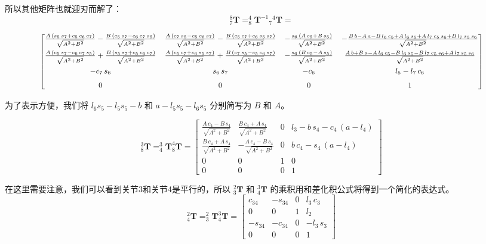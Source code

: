 \documentclass{homework}
\begin{document}
\begin{sol}
所以其他矩阵也就迎刃而解了：
\[
  _7^8\mathbf{T} = _8^4\mathbf{T}^{-1} {_7}^4\mathbf{T} = 
\]

\[
  \small
  \begin{bmatrix} 
    \frac{A\,\left(s_{5}\,s_{7}+c_{5}\,c_{6}\,c_{7}\right)}{\sqrt{A^2+B^2}}-\frac{B\,\left(c_{5}\,s_{7}-c_{6}\,c_{7}\,s_{5}\right)}{\sqrt{A^2+B^2}} & 
    \frac{A\,\left(c_{7}\,s_{5}-c_{5}\,c_{6}\,s_{7}\right)}{\sqrt{A^2+B^2}}-\frac{B\,\left(c_{5}\,c_{7}+c_{6}\,s_{5}\,s_{7}\right)}{\sqrt{A^2+B^2}} & 
    -\frac{s_{6}\,\left(A\,c_{5}+B\,s_{5}\right)}{\sqrt{A^2+B^2}} & 
    -\frac{B\,b-A\,a-B\,l_{6}\,c_{5}+A\,l_{6}\,s_{5}+A\,l_{7}\,c_{5}\,s_{6}+B\,l_{7}\,s_{5}\,s_{6}}{\sqrt{A^2+B^2}} \\[8pt] 
    \frac{A\,\left(c_{5}\,s_{7}-c_{6}\,c_{7}\,s_{5}\right)}{\sqrt{A^2+B^2}}+\frac{B\,\left(s_{5}\,s_{7}+c_{5}\,c_{6}\,c_{7}\right)}{\sqrt{A^2+B^2}} & 
    \frac{A\,\left(c_{5}\,c_{7}+c_{6}\,s_{5}\,s_{7}\right)}{\sqrt{A^2+B^2}}+\frac{B\,\left(c_{7}\,s_{5}-c_{5}\,c_{6}\,s_{7}\right)}{\sqrt{A^2+B^2}} & 
    -\frac{s_{6}\,\left(B\,c_{5}-A\,s_{5}\right)}{\sqrt{A^2+B^2}} & 
    \frac{A\,b+B\,a-A\,l_{6}\,c_{5}-B\,l_{6}\,s_{5}-B\,l_{7}\,c_{5}\,s_{6}+A\,l_{7}\,s_{5}\,s_{6}}{\sqrt{A^2+B^2}} \\[8pt] 
    -c_{7}\,s_{6} & s_{6}\,s_{7} & -c_{6} & l_{5}-l_{7}\,c_{6} \\[6pt] 
    0 & 0 & 0 & 1
  \end{bmatrix}
\]

为了表示方便，我们将 $ l_6 s_5 - l_5 s_5 - b $ 和 $ a - l_5 s_5 - l_6 s_5 $ 分别简写为 $ B $ 和 $ A $。

\[
  _8^3\mathbf{T} = _4^3\mathbf{T} _8^4\mathbf{T} =
  \begin{bmatrix} 
\frac{A\,c_{4}-B\,s_{4}}{\sqrt{A^2+B^2}} & \frac{B\,c_{4}+A\,s_{4}}{\sqrt{A^2+B^2}} & 0 & l_{3}-b\,s_{4}-c_{4}\,\left(a-l_{4}\right) \\ 
\frac{B\,c_{4}+A\,s_{4}}{\sqrt{A^2+B^2}} & -\frac{A\,c_{4}-B\,s_{4}}{\sqrt{A^2+B^2}} & 0 & b\,c_{4}-s_{4}\,\left(a-l_{4}\right) \\ 
0 & 0 & 1 & 0 \\ 
0 & 0 & 0 & 1
\end{bmatrix}
\]

在这里需要注意，我们可以看到关节3和关节4是平行的，所以 $ _3^2\mathbf{T} $ 和 $ _4^3\mathbf{T} $ 的乘积用和差化积公式将得到一个简化的表达式。
\[
  _4^2\mathbf{T} = _3^2\mathbf{T} _4^3\mathbf{T} =
  \begin{bmatrix} 
    c_{34} & -s_{34} & 0 & l_{3}\,c_{3} \\ 
    0 & 0 & 1 & l_{2} \\ 
    -s_{34} & -c_{34} & 0 & -l_{3}\,s_{3} \\ 
    0 & 0 & 0 & 1
  \end{bmatrix}
\]


\end{sol}
\end{document}
